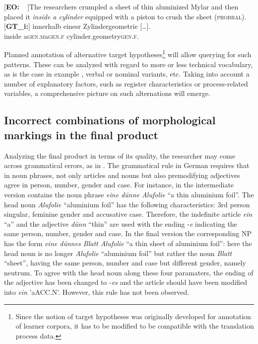 \documentclass[output=paper]{LSP/langsci}
\begin{document}
\ea \label{ex:1:6}
\begin{xlist}
\exi{}[\textbf{EO:~~}]{The researchers crumpled a sheet of thin aluminized Mylar and then placed it \emph{inside a cylinder} equipped with a piston to crush the sheet (\textsc{probral}).}
\exi{}[\textbf{GT\_i:}]{
\gll [...] innerhalb\raute{} eines\stern\raute\stern\stern\stern\stern\pfeil\pfeil{}r\raute{}  Z\stern{}ylindergeometrie [\dots].\\
{} inside a\textsc{gen.m}\stern\raute\stern\stern\stern\stern{}a\textsc{gen.f} cylinder.geometry\textsc{gen.f}.\\}
\end{xlist}
\z

Planned annotation of alternative target hypotheses\footnote{Since the notion of target hypotheses was originally developed for annotation of learner corpora, it has to be modified to be compatible with the translation process data.}  will allow querying for such patterns. These can be analyzed with regard to more or less technical vocabulary, as is the case in example , verbal or nominal variants, etc. Taking into account a number of explanatory factors, such as register characteristics or process-related variables, a comprehensive picture on such alternations will emerge. 

\subsection{Incorrect combinations of morphological markings in the final product} \label{sec:1:3:3}
Analyzing the final product in terms of its quality, the researcher may come across grammatical errors, as in . The grammatical rule in German requires that in noun phrases, not only articles and nouns but also premodifying adjectives agree in person, number, gender and case. For instance, in  the intermediate version contains the noun phrase \textit{eine dünne Alufolie} “a thin aluminium foil”. The head noun \textit{Alufolie} “aluminium foil” has the following characteristics: 3rd person singular, feminine gender and accusative case. Therefore, the indefinite article \textit{ein} “a” and the adjective \textit{dünn} “thin” are used with the ending -\textit{e} indicating the same person, number, gender and case. In the final version the corresponding NP has the form \textit{eine dünnes Blatt Alufolie} “a thin sheet of aluminium foil”: here the head noun is no longer \textit{Alufolie} “aluminium foil” but rather the noun \textit{Blatt} “sheet”, having the same person, number and case but different gender, namely neutrum. To agree with the head noun along these four paramaters, the ending of the adjective has been changed to -\textit{es} and the article should have been modified into \textit{ein} 'a{\tiny ACC.N}'. However, this rule has not been observed.
\end{document}
